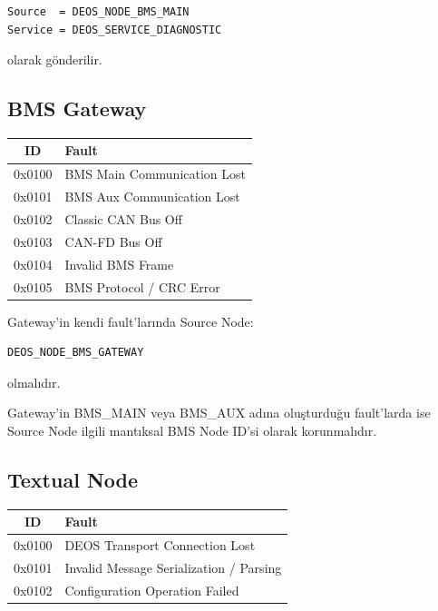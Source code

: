 \documentclass[a4paper,11pt]{article}
\begin{document}
\begin{lstlisting}
Source  = DEOS_NODE_BMS_MAIN
Service = DEOS_SERVICE_DIAGNOSTIC
\end{lstlisting}

olarak gönderilir.

\subsection{BMS Gateway}

\begin{center}
\begin{tabular}{c l}
\toprule
\textbf{ID} & \textbf{Fault} \\
\midrule
0x0100 & BMS Main Communication Lost \\
0x0101 & BMS Aux Communication Lost \\
0x0102 & Classic CAN Bus Off \\
0x0103 & CAN-FD Bus Off \\
0x0104 & Invalid BMS Frame \\
0x0105 & BMS Protocol / CRC Error \\
\bottomrule
\end{tabular}
\end{center}

Gateway'in kendi fault'larında Source Node:

\begin{lstlisting}
DEOS_NODE_BMS_GATEWAY
\end{lstlisting}

olmalıdır.

Gateway'in BMS_MAIN veya BMS_AUX adına oluşturduğu fault'larda ise
Source Node ilgili mantıksal BMS Node ID'si olarak korunmalıdır.

\subsection{Textual Node}

\begin{center}
\begin{tabular}{c l}
\toprule
\textbf{ID} & \textbf{Fault} \\
\midrule
0x0100 & DEOS Transport Connection Lost \\
0x0101 & Invalid Message Serialization / Parsing \\
0x0102 & Configuration Operation Failed \\
\bottomrule
\end{tabular}
\end{center}
\end{document}
